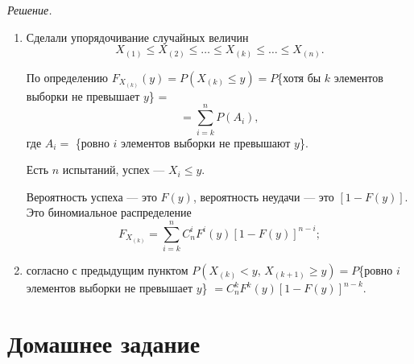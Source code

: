\textit{Решение.}
\begin{enumerate}[label=\alph*)]
  \item Сделали упорядочивание случайных величин
  $$X_{ \left( 1 \right) } \leq
    X_{ \left( 2 \right) } \leq
    \dotsc \leq
    X_{ \left( k \right) } \leq
    \dotsc \leq
    X_{ \left( n \right)}.$$

  По определению
  $F_{X_{ \left( k \right) }} \left( y \right) =
    P \left( X_{ \left( k \right) } \leq y \right) =
    P$\{хотя бы $k$ элементов выборки не превышает $y$\} =
  $$= \sum \limits_{i = k}^n P(A_i),$$
  где $A_i =$ \{ровно $i$ элементов выборки не превышают $y$\}.

  Есть $n$ испытаний, успех --- $X_i \leq y$.

  Вероятность успеха --- это $F \left( y \right) $, вероятность неудачи ---
  это $ \left[ 1 - F \left( y \right) \right] $.
  Это биномиальное распределение
  $$F_{X_{ \left( k \right) }} =
    \sum \limits_{i = k}^n
      C_n^i F^i \left( y \right) \left[ 1 - F \left( y \right) \right]^{n - i};$$
  \item согласно с предыдущим пунктом
  $P \left( X_{ \left( k \right) } < y, \, X_{ \left( k + 1 \right) } \geq y \right) =
    P$\{ровно $i$ элементов выборки не превышает $y$\} $=
    C_n^k F^k \left( y \right) \left[ 1 - F \left( y \right) \right]^{n - k}$.
\end{enumerate}

\section*{Домашнее задание}
